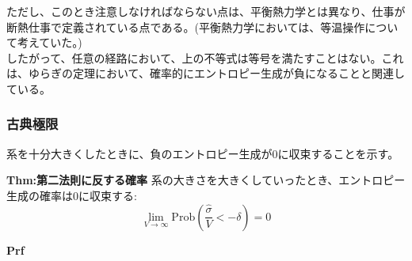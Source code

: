 \documentclass[a4paper,11pt]{jsarticle}
\begin{document}
ただし、このとき注意しなければならない点は、平衡熱力学とは異なり、仕事が断熱仕事で定義されている点である。(平衡熱力学においては、等温操作について考えていた。)\\
したがって、任意の経路において、上の不等式は等号を満たすことはない。これは、ゆらぎの定理において、確率的にエントロピー生成が負になることと関連している。\\

\subsubsection[6.1.2]{古典極限}
系を十分大きくしたときに、負のエントロピー生成が0に収束することを示す。\\
\begin{itembox}[l]{\textbf{Thm:第二法則に反する確率}}
    系の大きさを大きくしていったとき、エントロピー生成の確率は0に収束する:
    \begin{equation}
        \lim_{V \to \infty} \mathrm{Prob}\left(\frac{\hat{\sigma}}{V} < -\delta\right) = 0
    \end{equation}

\end{itembox}
\textbf{Prf}\\
\end{document}
